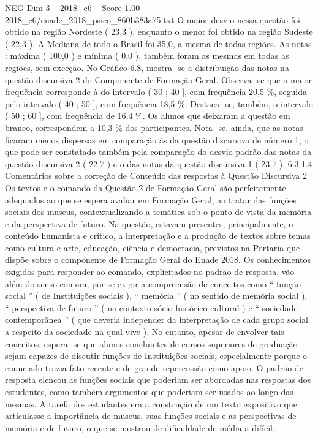 \begin{textsample}{NEG Dim 3 – 2018\_c6 – Score 1.00 – 2018\_c6/enade\_2018\_psico\_860b383a75.txt}
O maior desvio nessa questão foi obtido na região Nordeste ( 23,3 ), enquanto o menor foi obtido na região Sudeste ( 22,3 ).
A Mediana de todo o Brasil foi 35,0, a mesma de todas regiões.
As notas : máxima ( 100,0 ) e mínima ( 0,0 ), também foram as mesmas em todas as regiões, sem exceção.
No Gráfico 6.8, mostra -se a distribuição das notas na questão discursiva 2 do Componente de Formação Geral.
Observa -se que a maior frequência corresponde à do intervalo ( 30 ; 40 ], com frequência 20,5 \%, seguida pelo intervalo ( 40 ; 50 ], com frequência 18,5 \%.
Destaca -se, também, o intervalo ( 50 ; 60 ], com frequência de 16,4 \%.
Os alunos que deixaram a questão em branco, correspondem a 10,3 \% dos participantes.
Nota -se, ainda, que as notas ficaram menos dispersas em comparação às da questão discursiva de número 1, o que pode ser constatado também pela comparação do desvio padrão das notas da questão discursiva 2 ( 22,7 ) e o das notas da questão discursiva 1 ( 23,7 ). 6.3.1.4 Comentários sobre a correção de Conteúdo das respostas à Questão Discursiva 2 Os textos e o comando da Questão 2 de Formação Geral são perfeitamente adequados ao que se espera avaliar em Formação Geral, ao tratar das funções sociais dos museus, contextualizando a temática sob o ponto de vista da memória e da perspectiva de futuro.
Na questão, estavam presentes, principalmente, o conteúdo humanista e crítico, a interpretação e a produção de textos sobre temas como cultura e arte, educação, ciência e democracia, previstos na Portaria que dispõe sobre o componente de Formação Geral do Enade 2018.
Os conhecimentos exigidos para responder ao comando, explicitados no padrão de resposta, vão além do senso comum, por se exigir a compreensão de conceitos como “ função social ” ( de Instituições sociais ), “ memória ” ( no sentido de memória social ), “ perspectiva de futuro ” ( no contexto sócio-histórico-cultural ) e “ sociedade contemporânea ” ( que deveria independer da interpretação de cada grupo social a respeito da sociedade na qual vive ).
No entanto, apesar de envolver tais conceitos, espera -se que alunos concluintes de cursos superiores de graduação sejam capazes de discutir funções de Instituições sociais, especialmente porque o enunciado trazia fato recente e de grande repercussão como apoio.
O padrão de resposta elencou as funções sociais que poderiam ser abordadas nas respostas dos estudantes, como também argumentos que poderiam ser usados ao longo das mesmas.
A tarefa dos estudantes era a construção de um texto expositivo que articulasse a importância de museus, suas funções sociais e as perspectivas de memória e de futuro, o que se mostrou de dificuldade de média a difícil.

\end{textsample}
